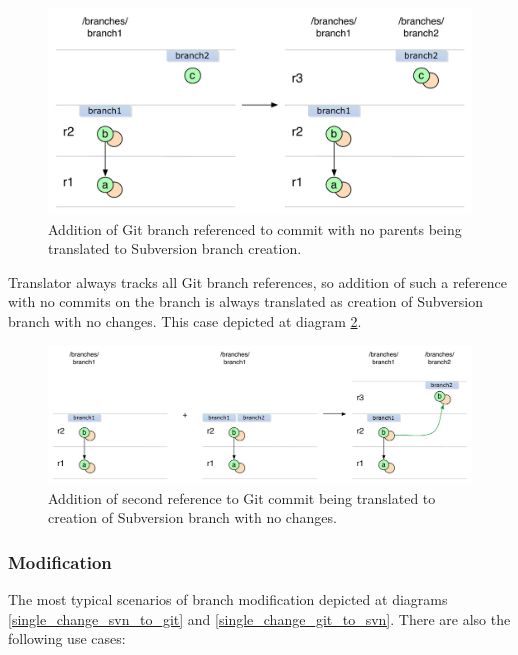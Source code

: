 \begin{figure}[!h]
\centering
\renewcommand{\figurename}{Diagram}
\includegraphics[width=\linewidth]{img/diagrams/branch_creation_no_history_git_to_svn.pdf}
\caption{Addition of Git branch referenced to commit with no parents being translated to Subversion branch creation.}
\label{branch_creation_no_history_git_to_svn}
\end{figure}

Translator always tracks all Git branch references, so addition of such a reference with no commits on the branch is always translated as creation of Subversion branch with no changes. This case depicted at diagram \ref{svn_no_change_branch_creation_git_to_svn}.

\begin{figure}[!h]
\centering
\renewcommand{\figurename}{Diagram}
\includegraphics[width=\linewidth]{img/diagrams/svn_no_change_branch_creation_git_to_svn.pdf}
\caption{Addition of second reference to Git commit being translated to creation of Subversion branch with no changes.}
\label{svn_no_change_branch_creation_git_to_svn}
\end{figure}

\clearpage
\subsubsection{Modification}

The most typical scenarios of branch modification depicted at diagrams \ref{single_change_svn_to_git} and \ref{single_change_git_to_svn}. There are also the following use cases:

